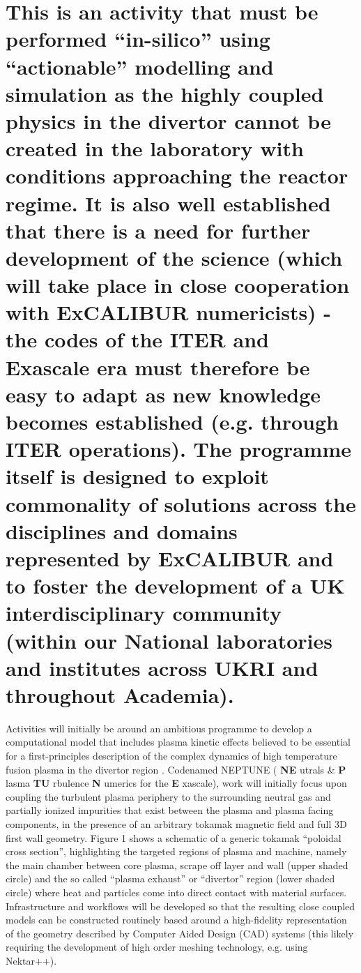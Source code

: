 \documentclass{article}
\begin{document}
\vspace{12pt}
\section*{{\color{color29} This is an activity that must be performed ``in-silico'' 
using ``actionable'' modelling and simulation as the highly coupled physics in 
the divertor cannot be created in the laboratory with conditions approaching the 
reactor regime. It is also well established that there is a need for further development 
of the science (which will take place in close cooperation with ExCALIBUR numericists) 
- the codes of the ITER and Exascale era must therefore be easy to adapt as new 
knowledge becomes established (e.g. through ITER operations). The programme itself 
is designed to exploit commonality of solutions across the disciplines and domains 
represented by ExCALIBUR and to foster the development of a UK interdisciplinary 
community (within our National laboratories and institutes across UKRI and throughout 
Academia).}}

\vspace{24pt}
\leftskip=-14pt
Activities will initially be around an ambitious programme to develop a computational 
model that includes plasma kinetic effects believed to be essential for a first-principles 
description of the complex dynamics of high temperature fusion plasma in the divertor 
region{\color{color11} . }{\color{color29} Codenamed NEPTUNE (}{\color{color29} \textbf{NE}}{\color{color29} utrals 
\& }{\color{color29} \textbf{P}}{\color{color29} lasma }{\color{color29} \textbf{TU}}{\color{color29} rbulence 
}{\color{color29} \textbf{N}}{\color{color29} umerics for the }{\color{color29} \textbf{E}}{\color{color29} xascale), 
work will initially focus upon coupling the turbulent plasma periphery to the surrounding 
neutral gas and partially ionized impurities that exist between the plasma and 
plasma facing components, in the presence of an arbitrary tokamak magnetic field 
and full 3D first wall geometry. Figure 1 shows a schematic of a generic tokamak 
``poloidal cross section'', highlighting the targeted regions of plasma and machine, 
namely the main chamber between core plasma, scrape off layer and wall (upper shaded 
circle) and the so called ``plasma exhaust'' or ``divertor'' region (lower shaded 
circle) where heat and particles come into direct contact with material surfaces. 
Infrastructure and workflows will be developed so that the resulting close coupled 
models can be constructed routinely based around a high-fidelity representation 
of the geometry described by Computer Aided Design (CAD) systems (this likely requiring 
the development of high order meshing technology, e.g. using Nektar++).}
\end{document}
